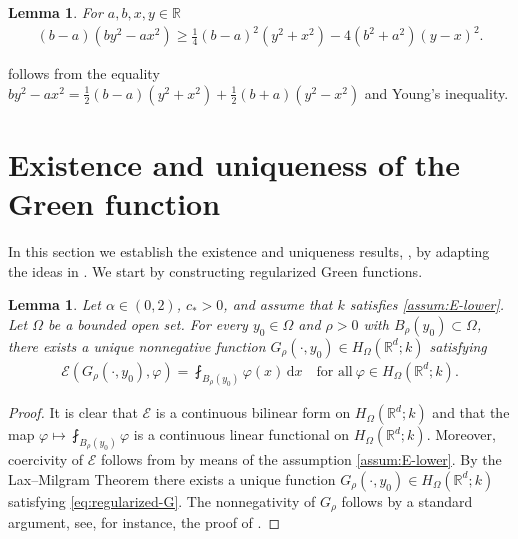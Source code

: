 \documentclass[reqno]{amsart}
\theoremstyle{plain}
\newtheorem{lemma}[theorem]{Lemma}
\theoremstyle{definition}
\numberwithin{equation}{section}
\newcommand{\R}{\mathbb{R}}
\newcommand{\Rd}{\mathbb{R}^d}
\newcommand{\dx} {\, \mathrm{d}x}
\newcommand{\cl} {c_{\ast}}
\begin{document}
\begin{lemma} \label{lem:inequality4}
For $a,b,x,y \in \R$
\begin{align*}
(b-a)(by^2 - ax^2) \geq \frac{1}{4} (b-a)^2 (y^2 + x^2) - 4(b^2 + a^2) (y-x)^2.
\end{align*}
\end{lemma}

 follows from the equality $by^2 - ax^2 = \frac{1}{2} (b-a)(y^2+x^2) + \frac{1}{2} (b+a)(y^2 -x^2)$ and Young's inequality.





\section{Existence and uniqueness of the Green function} \label{sec:existence}

In this section we establish the existence and uniqueness results, , by adapting the ideas in \cite{GrWi82,BeFr02,KaSt02}. We start by constructing regularized Green functions.

\begin{lemma}
Let $\alpha \in (0, 2)$, $\cl > 0$, and assume that $k$ satisfies \eqref{assum:E-lower}. Let $\Omega$ be a bounded open set. 
For every $y_0 \in \Omega$ and $\rho > 0$ with $B_\rho(y_0) \subset \Omega$,
there exists a unique nonnegative function $G_\rho(\cdot, y_0) \in H_\Omega(\Rd;k)$ satisfying
\begin{align} \label{eq:regularized-G}
\mathcal{E}(G_\rho(\cdot, y_0), \varphi) = \fint_{B_\rho(y_0)} \varphi(x) \dx \quad\text{for all}~ \varphi \in H_\Omega(\Rd;k).
\end{align}
\end{lemma}

\begin{proof}
It is clear that $\mathcal{E}$ is a continuous bilinear form on $H_\Omega(\Rd;k)$
and that the map $\varphi \mapsto \fint_{B_\rho(y_0)} \varphi$ is a continuous linear functional on $H_\Omega(\Rd;k)$. 
Moreover, coercivity of $\mathcal{E}$ follows from 
\cite[Lemma 2.9]{FKV15} by means of the assumption \eqref{assum:E-lower}. By the Lax--Milgram Theorem there exists a unique function $G_\rho(\cdot, y_0) \in H_\Omega(\Rd;k)$ satisfying \eqref{eq:regularized-G}. 
The nonnegativity of $G_\rho$ follows by a standard argument, see, for instance, the proof of \cite[Theorem 1.1]{GrWi82}.
\end{proof}
\end{document}
